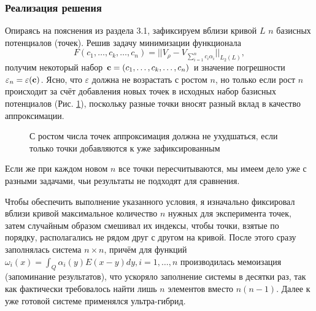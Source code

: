 \documentclass[a4paper, 12pt]{article}
\newcommand{\V}[1]{\int_Q #1(y) E(x-y) dy}
\begin{document}
\subsubsection{Реализация решения}
Опираясь на пояснения из раздела 3.1, зафиксируем вблизи кривой $L$ $n$ базисных потенциалов (точек).
Решив задачу минимизации функционала
\begin{equation*}
  F(c_1,\dots,c_k,\dots,c_n)=||V_{\rho}-V_{\sum_{i=1}^n c_i \alpha_i}||_{L_2(L)},
\end{equation*}
получим некоторый набор ${\bf c}=(c_1,\dots,c_k,\dots,c_n)$ и значение погрешности $\varepsilon_n = \varepsilon ({\bf c})$.
Ясно, что $\varepsilon$ должна не возрастать с ростом $n$, но только если рост $n$ происходит за счёт добавления новых точек в исходных набор базисных потенциалов (Рис. \ref{points2}),
поскольку разные точки вносят разный вклад в качество аппроксимации.
\begin{figure}[h!]
  \noindent{}
  \caption{С ростом числа точек аппроксимация должна не ухудшаться, если только точки добавляются к уже зафиксированным}
  \label{points2}
  \end{figure} 

Если же при каждом новом $n$ все точки пересчитываются, мы имеем дело уже с разными задачами, чьи результаты не подходят для сравнения.

Чтобы обеспечить выполнение указанного условия, я изначально фиксировал вблизи кривой максимальное количество $n$ нужных для эксперимента точек,
затем случайным образом смешивал их индексы, чтобы точки, взятые по порядку, располагались не рядом друг с другом на кривой.
После этого сразу заполнялась система $n \times n$, причём для функций $\omega_i(x) =\V{\alpha_i}, i=1,\dots,n$ производилась мемоизация (запоминание результатов), что ускоряло заполнение системы в десятки раз, так как
фактически требовалось найти лишь $n$ элементов вместо $n(n-1)$.
Далее к уже готовой системе применялся ультра-гибрид.
\end{document}
